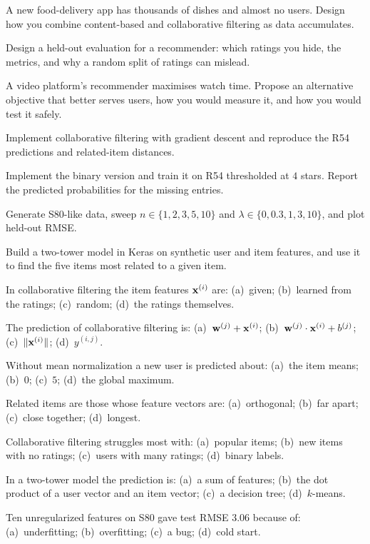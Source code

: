 \dpr A new food-delivery app has thousands of dishes and almost no users. Design how
you combine content-based and collaborative filtering as data accumulates.

\dpr Design a held-out evaluation for a recommender: which ratings you hide, the
metrics, and why a random split of ratings can mislead.

\dpr A video platform's recommender maximises watch time. Propose an alternative
objective that better serves users, how you would measure it, and how you would
test it safely.


\pe Implement collaborative filtering with gradient descent and reproduce the R54
predictions and related-item distances.

\pe Implement the binary version and train it on R54 thresholded at $4$ stars.
Report the predicted probabilities for the missing entries.

\pe Generate S80-like data, sweep $n \in \{1, 2, 3, 5, 10\}$ and $\lambda \in \{0,
0.3, 1, 3, 10\}$, and plot held-out RMSE.

\pe Build a two-tower model in Keras on synthetic user and item features, and use
it to find the five items most related to a given item.


\qz In collaborative filtering the item features $\mathbf{x}^{(i)}$ are: (a)~given;
(b)~learned from the ratings; (c)~random; (d)~the ratings themselves.

\qz The prediction of collaborative filtering is: (a)~$\mathbf{w}^{(j)}+\mathbf{x}^{(i)}$;
(b)~$\mathbf{w}^{(j)}\cdot\mathbf{x}^{(i)} + b^{(j)}$; (c)~$\|\mathbf{x}^{(i)}\|$; (d)~$y^{(i,j)}$.

\qz Without mean normalization a new user is predicted about: (a)~the item means;
(b)~$0$; (c)~$5$; (d)~the global maximum.

\qz Related items are those whose feature vectors are: (a)~orthogonal; (b)~far
apart; (c)~close together; (d)~longest.

\qz Collaborative filtering struggles most with: (a)~popular items; (b)~new items
with no ratings; (c)~users with many ratings; (d)~binary labels.

\qz In a two-tower model the prediction is: (a)~a sum of features; (b)~the dot
product of a user vector and an item vector; (c)~a decision tree; (d)~$k$-means.

\qz Ten unregularized features on S80 gave test RMSE $3.06$ because of:
(a)~underfitting; (b)~overfitting; (c)~a bug; (d)~cold start.

